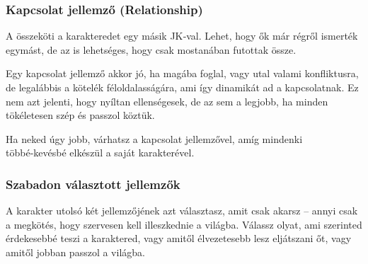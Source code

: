 \subsubsection{Kapcsolat jellemző (Relationship)}

A  összeköti a karakteredet egy másik JK‑val. Lehet, hogy ők már régről ismerték egymást, de az is lehetséges, hogy csak mostanában futottak össze.

Egy kapcsolat jellemző akkor jó, ha magába foglal, vagy utal valami konfliktusra, de legalábbis a kötelék féloldalasságára, ami így dinamikát ad a kapcsolatnak. Ez nem azt jelenti, hogy nyíltan ellenségesek, de az sem a legjobb, ha minden tökéletesen szép és passzol köztük.

Ha neked úgy jobb, várhatsz a kapcsolat jellemzővel, amíg mindenki többé‑kevésbé elkészül a saját karakterével.

\subsubsection{Szabadon választott jellemzők}

A karakter utolsó két jellemzőjének azt választasz, amit csak akarsz – annyi csak a megkötés, hogy szervesen kell illeszkednie a világba. Válassz olyat, ami szerinted érdekesebbé teszi a karaktered, vagy amitől élvezetesebb lesz eljátszani őt, vagy amitől jobban passzol a világba.
